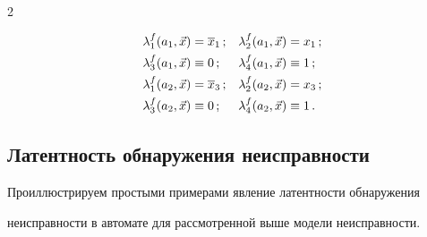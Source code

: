\begin{multicols}{2}
\vspace*{-24pt}





\noindent


\begin{align*}


\lambda_1^f(a_1,\v x) &= \o x_1\,;


&


\lambda_2^f(a_1,\v x) &= x_1\,;\\




\lambda_3^f(a_1,\v x) &\equiv 0\,;


&


\lambda_4^f(a_1,\v x) & \equiv 1\,;


\\


\lambda_1^f(a_2,\v x) &= \o x_3\,;


&


\lambda_2^f(a_2,\v x) &= x_3\,;\\


\lambda_3^f(a_2,\v x) & \equiv 0\,;


&


\lambda_4^f(a_2,\v x) &\equiv 1\,.


\end{align*}















\vspace*{-6pt}







\subsection{Латентность обнаружения неисправности}





Проиллюстрируем простыми примерами явление латентности обнаружения


неисправности в автомате для рассмотренной выше модели неисправности.






\end{multicols}
